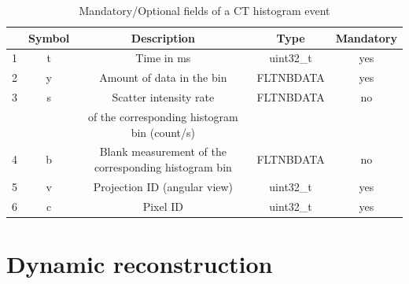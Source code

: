 \documentclass[a4paper, 11pt]{article}
\begin{document}
\begin{table} [h!]
  \small
  \caption{Mandatory/Optional fields of a CT histogram event}
  \label{table_CT_data_bin_histogram}
  \begin{center}
  \begin{tabular}{|c|c|c|c|c|}
  \hline
   & \textbf{Symbol} & \textbf{Description} & \textbf{Type} & \textbf{Mandatory}\\
  \hline
  \hline
  1 & t & Time in ms & uint32\_t & yes \\ \hline
  2 & y & Amount of data in the bin & FLTNBDATA & yes \\ \hline
  3 & s & Scatter intensity rate & FLTNBDATA & no \\ 
  & & of the corresponding histogram bin (count/s) & &  \\ \hline
  4 & b & Blank measurement of the corresponding histogram bin & FLTNBDATA & no \\ \hline
  5 & v & Projection ID (angular view) & uint32\_t & yes \\ \hline
  6 & c & Pixel ID & uint32\_t & yes \\ \hline
  \end{tabular}
  \end{center}
\end{table}





\clearpage
\section{Dynamic reconstruction}
\label{s_dynamic}
\end{document}
